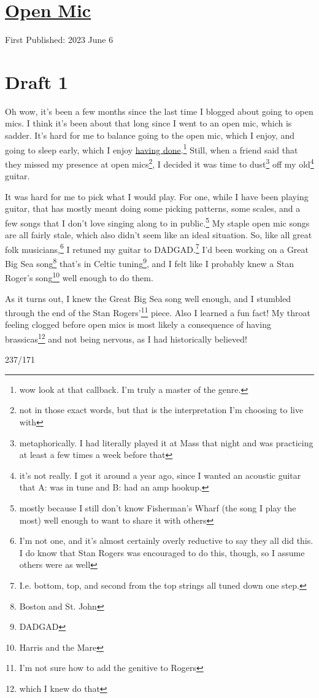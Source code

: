 \documentclass[12pt]{article}[titlepage]
\newcommand{\1}{\={a}}
\newcommand{\2}{\={e}}
\newcommand{\3}{\={\i}}
\newcommand{\4}{\=o}
\newcommand{\5}{\=u}
\newcommand{\6}{\={A}}
\renewcommand{\,}{\textsuperscript{,}}
\begin{document}
\doublespacing
\section{\href{open-mic-6.html}{Open Mic}}
First Published: 2023 June 6

\section{Draft 1}
Oh wow, it's been a few months since the last time I blogged about going to open mics.
I think it's been about that long since I went to an open mic, which is sadder.
It's hard for me to balance going to the open mic, which I enjoy, and going to sleep early, which I enjoy \href{do-versus-done.html}{having done}.\footnote{wow look at that callback. I'm truly a master of the genre.}
Still, when a friend said that they missed my presence at open mics\footnote{not in those exact words, but that is the interpretation I'm choosing to live with}, I decided it was time to dust\footnote{metaphorically. I had literally played it at Mass that night and was practicing at least a few times a week before that} off my old\footnote{it's not really. I got it around a year ago, since I wanted an acoustic guitar that A: was in tune and B: had an amp hookup.} guitar.

It was hard for me to pick what I would play.
For one, while I have been playing guitar, that has mostly meant doing some picking patterns, some scales, and a few songs that I don't love singing along to in public.\footnote{mostly because I still don't know Fisherman's Wharf (the song I play the most) well enough to want to share it with others}
My staple open mic songs are all fairly stale, which also didn't seem like an ideal situation.
So, like all great folk musicians,\footnote{I'm not one, and it's almost certainly overly reductive to say they all did this. I do know that Stan Rogers was encouraged to do this, though, so I assume others were as well} I retuned my guitar to DADGAD.\footnote{I.e. bottom, top, and second from the top strings all tuned down one step.}
I'd been working on a Great Big Sea song\footnote{Boston and St. John} that's in Celtic tuning\footnote{DADGAD}, and I felt like I probably knew a Stan Roger's song\footnote{Harris and the Mare} well enough to do them.

As it turns out, I knew the Great Big Sea song well enough, and I stumbled through the end of the Stan Rogers'\footnote{I'm not sure how to add the genitive to Rogers} piece.
Also I learned a fun fact!
My throat feeling clogged before open mics is most likely a consequence of having brassicas\footnote{which I knew do that} and not being nervous, as I had historically believed!

237/171
\end{document}
